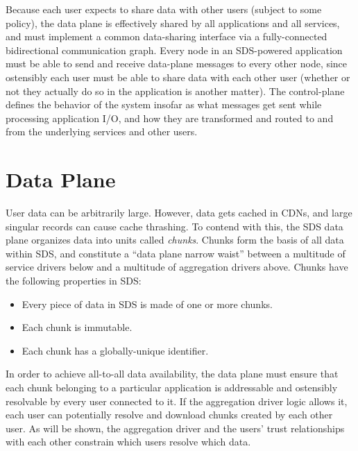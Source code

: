 Because each user expects to share data with other users (subject to some
policy), the data plane is effectively shared by all applications and all
services, and must implement a common data-sharing interface via a fully-connected
bidirectional communication graph.
Every node in an SDS-powered application must be able to send and receive data-plane
messages to every other node, since ostensibly each user must be able to share
data with each other user (whether or not they actually do so in the application
is another matter).  The control-plane defines the behavior of the
system insofar as what messages get sent while processing application I/O, and how they are
transformed and routed to and from the underlying services and other users.

\section{Data Plane}

User data can be arbitrarily large.  However, data gets cached in CDNs, and
large singular records can cause cache thrashing.  To contend with this,
the SDS data plane organizes data into units called \emph{chunks}.  Chunks form
the basis of all data within SDS, and constitute a ``data plane narrow waist'' between 
a multitude of service drivers below and a multitude of aggregation drivers
above.  Chunks have the following properties in SDS:

\begin{itemize}
    \item Every piece of data in SDS is made of one or more chunks.
    \item Each chunk is immutable.
    \item Each chunk has a globally-unique identifier.
\end{itemize}

In order to achieve all-to-all data availability, the 
data plane must ensure that each chunk belonging to a particular application
is addressable and ostensibly resolvable by every user connected to it.
If the aggregation driver logic allows it, each user
can potentially resolve and download chunks created by each other user.
As will be shown, the aggregation driver and the users' trust relationships with
each other constrain which users resolve which data.

